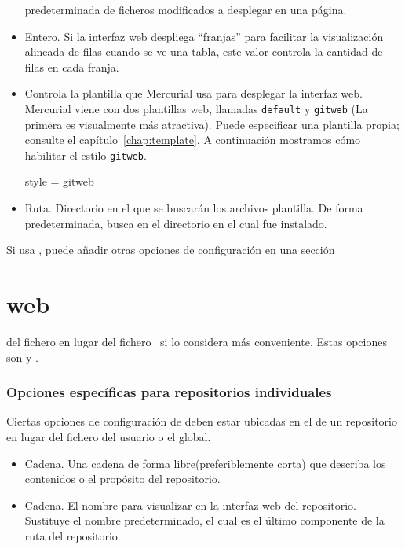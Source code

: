 \begin{itemize}
  predeterminada de ficheros modificados a desplegar en una página.
\item[\rcitem{web}{stripes}] Entero.  Si la interfaz web despliega
  ``franjas'' para facilitar la visualización alineada de filas cuando
  se ve una tabla, este valor controla la cantidad de filas en cada
  franja.
\item[\rcitem{web}{style}] Controla la plantilla que Mercurial usa para
  desplegar la interfaz web.  Mercurial viene con dos plantillas web,
  llamadas \texttt{default} y \texttt{gitweb} (La primera es
  visualmente más atractiva).  Puede especificar una plantilla propia;
  consulte el capítulo~\ref{chap:template}.  A continuación mostramos
  cómo habilitar el estilo \texttt{gitweb}.
  \begin{codesample4}
    [web]
    style = gitweb
  \end{codesample4}
\item[\rcitem{web}{templates}] Ruta.  Directorio en el que se buscarán
  los archivos plantilla.  De forma predeterminada, busca en el
  directorio en el cual fue instalado.
\end{itemize}
Si usa , puede añadir otras opciones de
configuración en una sección \section{web} del fichero
 en lugar del fichero \hgrc\, si lo considera
más conveniente.  Estas opciones son  y
.

\subsubsection{Opciones específicas para repositorios individuales}

Ciertas opciones de configuración de  deben estar
ubicadas en el  de un repositorio en lugar del
fichero del usuario o el \hgrc global.
\begin{itemize}
\item[\rcitem{web}{description}] Cadena.  Una cadena de forma
  libre(preferiblemente corta) que describa los contenidos o el
  propósito del repositorio.
\item[\rcitem{web}{name}] Cadena.  El nombre para visualizar en la
  interfaz web del repositorio. Sustituye el nombre predeterminado, el
  cual es el último componente de la ruta del repositorio.
\end{itemize}

